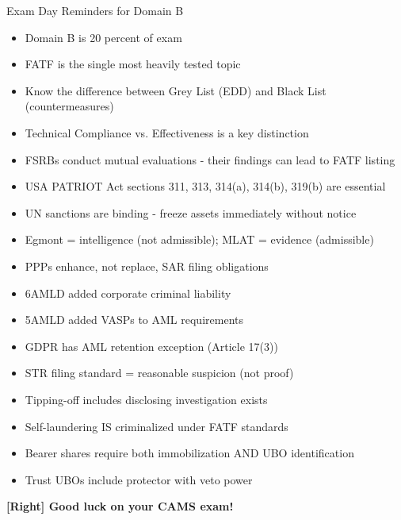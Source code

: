 \documentclass[11pt,a4paper]{beamer}
\newcommand{\greennote}[1]{\textcolor{green!50!black}{\textbf{[Right] #1}}}
\begin{document}
\begin{frame}{Exam Day Reminders for Domain B}
	\begin{itemize}
		\item Domain B is 20 percent of exam
		\item FATF is the single most heavily tested topic
		\item Know the difference between Grey List (EDD) and Black List (countermeasures)
		\item Technical Compliance vs. Effectiveness is a key distinction
		\item FSRBs conduct mutual evaluations - their findings can lead to FATF listing
		\item USA PATRIOT Act sections 311, 313, 314(a), 314(b), 319(b) are essential
		\item UN sanctions are binding - freeze assets immediately without notice
		\item Egmont = intelligence (not admissible); MLAT = evidence (admissible)
		\item PPPs enhance, not replace, SAR filing obligations
		\item 6AMLD added corporate criminal liability
		\item 5AMLD added VASPs to AML requirements
		\item GDPR has AML retention exception (Article 17(3))
		\item STR filing standard = reasonable suspicion (not proof)
		\item Tipping-off includes disclosing investigation exists
		\item Self-laundering IS criminalized under FATF standards
		\item Bearer shares require both immobilization AND UBO identification
		\item Trust UBOs include protector with veto power
	\end{itemize}
	\vspace{0.3cm}
	\centering
	\greennote{Good luck on your CAMS exam!}
\end{frame}
\end{document}
